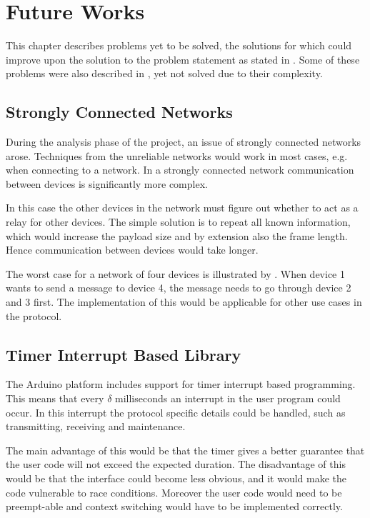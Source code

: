 \chapter{Future Works}
This chapter describes problems yet to be solved, the solutions for which could improve upon the solution to the problem statement as stated in . 
Some of these problems were also described in , yet not solved due to their complexity.

\section{Strongly Connected Networks}
During the analysis phase of the project, an issue of strongly connected networks arose.  
Techniques from the unreliable networks would work in most cases, e.g. when connecting to a network. 
In a strongly connected network communication between devices is significantly more complex.

\noindent
In this case the other devices in the network must figure out whether to act as a relay for other devices. 
The simple solution is to repeat all known information, which would increase the payload size and by extension also the frame length.
Hence communication between devices would take longer.

The worst case for a network of four devices is illustrated by .
When device 1 wants to send a message to device 4, the message needs to go through device 2 and 3 first.
The implementation of this would be applicable for other use cases in the protocol. 

\section{Timer Interrupt Based Library}
The Arduino platform includes support for timer interrupt based programming.
This means that every $\delta$ milliseconds an interrupt in the user program could occur.
In this interrupt the protocol specific details could be handled, such as transmitting, receiving and maintenance.

The main advantage of this would be that the timer gives a better guarantee that the user code will not exceed the expected duration.
The disadvantage of this would be that the interface could become less obvious, and it would make the code vulnerable to race conditions. 
Moreover the user code would need to be preempt-able and context switching would have to be implemented correctly.

